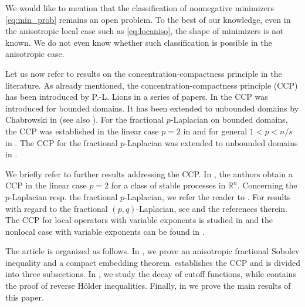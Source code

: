\documentclass[11pt]{amsart}
\theoremstyle{plain}
\theoremstyle{definition}
\numberwithin{equation}{section}
\newcommand{\R}{\mathbb{R}}
\begin{document}
We would like to mention that the classification of nonnegative minimizers \eqref{eq:min_prob} remains an open problem. To the best of our knowledge, even in the anisotropic local case such as \eqref{eq:locaniso}, the shape of minimizers is not known. We do not even know whether such classification is possible in the anisotropic case.  

Let us now refer to results on the concentration-compactness principle in the literature.
As already mentioned, the concentration-compactness principle (CCP) has been introduced by P.-L. Lions in a series of papers. In \cite{Lions3} the CCP was introduced for bounded domains. It has been extended to unbounded domains by Chabrowski in \cite{C95} (see also \cite{BCS95,BTW96}).
For the fractional $p$-Laplacian on bounded domains, the CCP was established in the linear case $p=2$ in \cite{Pala14} and for general $1<p<n/s$ in \cite{MoscSqua16}. The CCP for the fractional $p$-Laplacian was extended to unbounded domains in \cite{BSS18}.

We briefly refer to further results addressing the CCP. In \cite{PQR21}, the authors obtain a CCP in the linear case $p=2$ for a class of stable processes in $\R^n$.
Concerning the $p$-Laplacian resp. the fractional $p$-Laplacian, we refer the reader to \cite{GP91, BMS16}. For results with regard to the fractional $(p,q)$-Laplacian, see \cite{BM19,AAI19,Amb20} and the references therein. The CCP for local operators with variable exponents is studied in \cite{AB13,FBS10,Fu09,FZ10,HS16,HKS19} and the nonlocal case with variable exponents can be found in \cite{HK21}.

The article is organized as follows. In , we prove an anisotropic fractional Sobolev inequality and a compact embedding theorem. 
 establishes the CCP and is divided into three subsections. In , we study the decay of cutoff functions, while  contains the proof of reverse Hölder inequalities. Finally, in  we prove the main results of this paper.
\end{document}

